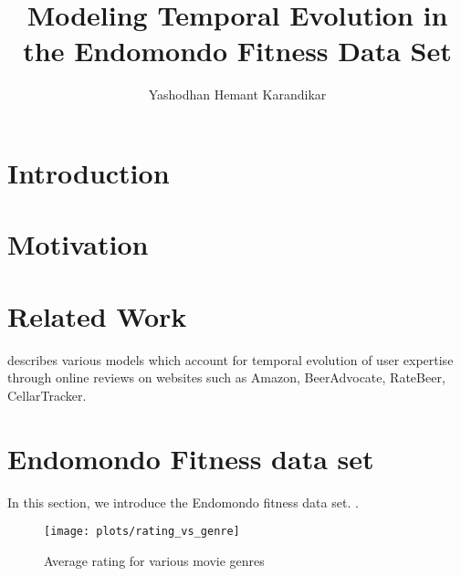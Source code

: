 \documentclass{acm_proc_article-sp}
\begin{document}
\title{Modeling Temporal Evolution in the Endomondo Fitness Data Set}
%
%
\author{
\alignauthor
Yashodhan Hemant Karandikar\\
}

\maketitle
\begin{abstract}

\end{abstract}

\section{Introduction}


\section{Motivation}


\section{Related Work}
\cite{www13} describes various models which account for temporal evolution of user expertise through online reviews on websites such as Amazon, BeerAdvocate, RateBeer, CellarTracker. 

\section{Endomondo Fitness data set}
\label{expAnalysis}
In this section, we introduce the Endomondo fitness data set. \cite{mldataset}. 

\begin{comment}
\begin{figure}[h]
\centering
\texttt{[image: plots/rating\_vs\_age]}
\caption{\label{plotRatingVsAge}Average rating for different age groups}
\end{figure}

\begin{figure*}
\centering
\texttt{[image: plots/rating\_vs\_occupation]}
\caption{\label{plotRatingVsOcc} Average rating for various occupations}
\end{figure*}
\end{comment}

\begin{figure*}
\centering
\texttt{[image: plots/rating\_vs\_genre]}
\caption{\label{plotRatingVsGenre} Average rating for various movie genres}
\end{figure*}
\end{document}
